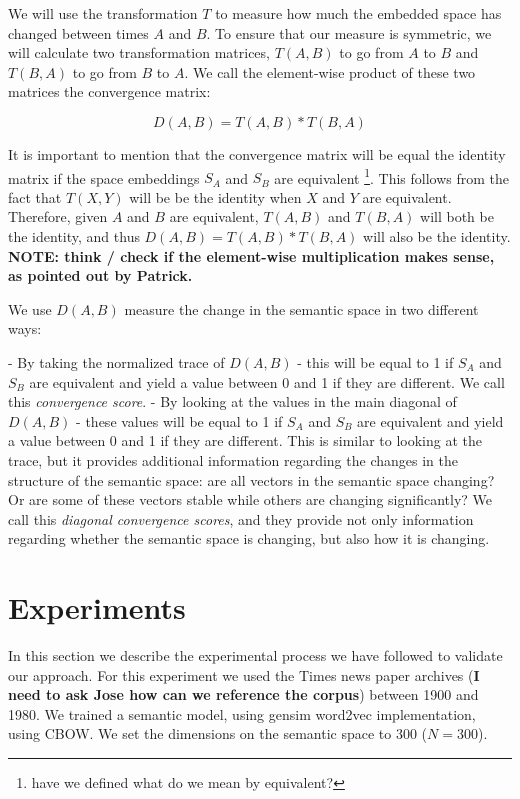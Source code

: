 \documentclass{article} %
\begin{document}
We will use the transformation $T$ to measure how much the embedded space has changed between times $A$ and $B$. To ensure that our measure is symmetric, we will calculate two transformation matrices, $T(A,B)$ to go from $A$ to $B$ and $T(B,A)$ to go from $B$ to $A$. We call the element-wise product of these two matrices the convergence matrix:

$$D(A,B) = T(A,B) * T(B,A)$$

It is important to mention that the convergence matrix will be equal the identity matrix if the space embeddings $S_A$ and $S_B$ are equivalent \footnote{have we defined what do we mean by equivalent?}. This follows from the fact that $T(X,Y)$ will be be the identity when $X$ and $Y$ are equivalent. Therefore, given $A$ and $B$ are equivalent, $T(A,B)$ and $T(B,A)$ will both be the identity, and thus $D(A,B) = T(A,B) * T(B,A)$ will also be the identity. \textbf{NOTE: think / check if the element-wise multiplication makes sense, as pointed out by Patrick.}

We use $D(A,B)$ measure the change in the semantic space in two different ways:

 - By taking the normalized trace of $D(A,B)$ - this will be equal to 1 if $S_A$ and $S_B$ are equivalent and yield a value between 0 and 1 if they are different. We call this \textit{convergence score}.
 - By looking at the values in the main diagonal of $D(A,B)$ - these values will be equal to 1 if $S_A$ and $S_B$ are equivalent and yield a value between 0 and 1 if they are different. This is similar to looking at the trace, but it provides additional information regarding the changes in the structure of the semantic space: are all vectors in the semantic space changing? Or are some of these vectors stable while others are changing significantly? We call this \textit{diagonal convergence scores}, and they provide not only information regarding whether the semantic space is changing, but also how it is changing.

\section{Experiments}
\label{sec:experiments}
In this section we describe the experimental process we have followed to validate our approach. For this experiment we used the Times news paper archives (\textbf{I need to ask Jose how can we reference the corpus}) between 1900 and 1980. We trained a semantic model, using gensim word2vec implementation, using CBOW. We set the dimensions on the semantic space to 300 ($N = 300$).
\end{document}
